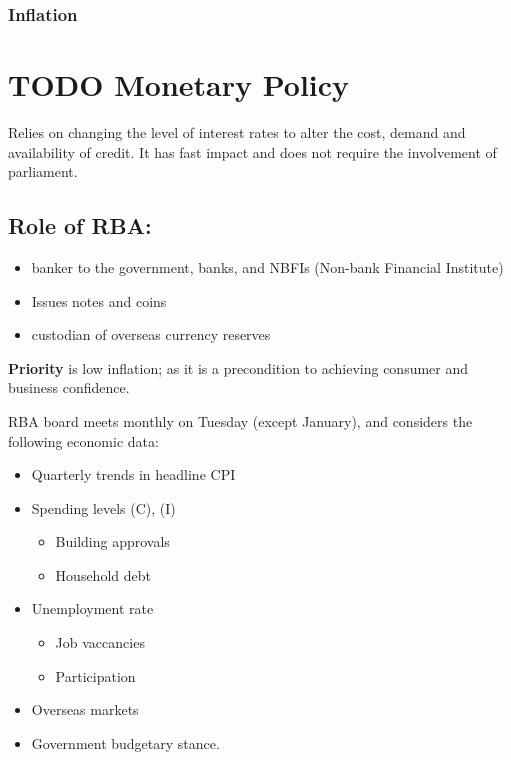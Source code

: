 \documentclass[11pt]{article}
\begin{document}
\subsubsection{Inflation}
\label{sec-2-4-3}

\section{{\bfseries\sffamily TODO} Monetary Policy}
\label{sec-3}

Relies on changing the level of interest rates to alter the cost,
demand and availability of credit. It has fast impact and does not
require the involvement of parliament.

\subsection{Role of RBA:}
\label{sec-3-1}

\begin{itemize}
\item banker to the government, banks, and NBFIs (Non-bank Financial
Institute)
\item Issues notes and coins
\item custodian of overseas currency reserves
\end{itemize}

\textbf{Priority} is low inflation; as it is a precondition to achieving
 consumer and business confidence.

RBA board meets monthly on Tuesday (except January), and considers the
following economic data:

\begin{itemize}
\item Quarterly trends in headline CPI
\item Spending levels (C), (I)
\begin{itemize}
\item Building approvals
\item Household debt
\end{itemize}
\item Unemployment rate
\begin{itemize}
\item Job vaccancies
\item Participation
\end{itemize}
\item Overseas markets
\item Government budgetary stance.
\end{itemize}
\end{document}
